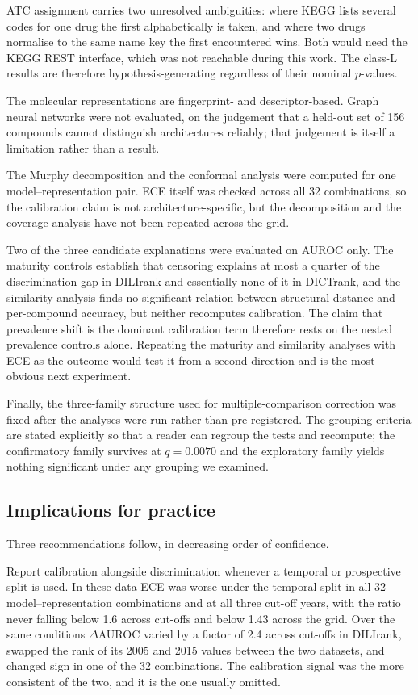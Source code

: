 ATC assignment carries two unresolved ambiguities: where KEGG lists several codes
for one drug the first alphabetically is taken, and where two drugs normalise to
the same name key the first encountered wins. Both would need the KEGG REST
interface, which was not reachable during this work. The class-L results are
therefore hypothesis-generating regardless of their nominal $p$-values.

The molecular representations are fingerprint- and descriptor-based. Graph neural
networks were not evaluated, on the judgement that a held-out set of 156 compounds
cannot distinguish architectures reliably; that judgement is itself a limitation
rather than a result.

The Murphy decomposition and the conformal analysis were computed for one
model--representation pair. ECE itself was checked across all 32 combinations, so
the calibration claim is not architecture-specific, but the decomposition and the
coverage analysis have not been repeated across the grid.

Two of the three candidate explanations were evaluated on AUROC only. The maturity
controls establish that censoring explains at most a quarter of the discrimination
gap in DILIrank and essentially none of it in DICTrank, and the similarity analysis
finds no significant relation between structural distance and per-compound accuracy,
but neither recomputes calibration. The claim that prevalence shift is the dominant
calibration term therefore rests on the nested prevalence controls alone. Repeating
the maturity and similarity analyses with ECE as the outcome would test it from a
second direction and is the most obvious next experiment.

Finally, the three-family structure used for multiple-comparison correction was
fixed after the analyses were run rather than pre-registered. The grouping criteria
are stated explicitly so that a reader can regroup the tests and recompute; the
confirmatory family survives at $q = 0.0070$ and the exploratory family yields
nothing significant under any grouping we examined.

\subsection{Implications for practice}

Three recommendations follow, in decreasing order of confidence.

Report calibration alongside discrimination whenever a temporal or prospective
split is used. In these data ECE was worse under the temporal split in all 32
model--representation combinations and at all three cut-off years, with the ratio
never falling below 1.6 across cut-offs and below 1.43 across the grid. Over the
same conditions $\Delta$AUROC varied by a factor of 2.4 across cut-offs in DILIrank,
swapped the rank of its 2005 and 2015 values between the two datasets, and changed
sign in one of the 32 combinations. The calibration signal was the more consistent of the two, and it
is the one usually omitted.

